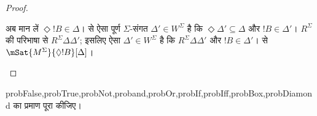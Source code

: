 \documentclass[../../../include/open-logic-section]{subfiles}
\begin{document}
\begin{proof}
\begin{enumerate}
{{{          अब मान लें $\Diamond !B \in \Delta$।
           से ऐसा पूर्ण $\Sigma$-संगत
          $\Delta' \in W^\Sigma$ है कि $\Diamond \Delta' \subseteq
          \Delta$ और $!B \in \Delta'$। $R^\Sigma$ की परिभाषा से $R^\Sigma
          \Delta\Delta'$; इसलिए ऐसा $\Delta' \in W^\Sigma$ है कि
          $R^\Sigma \Delta\Delta'$ और $!B \in \Delta'$।
           से
          $\mSat{M^\Sigma}{\Diamond !B}[\Delta]$।}}}{}
  \end{enumerate}
\end{proof}

\begin{probtag}{probFalse,probTrue,probNot,proband,probOr,probIf,probIff,probBox,probDiamond}
   का प्रमाण पूरा कीजिए।
\end{probtag}
\end{document}
